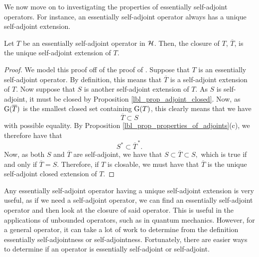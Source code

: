 We now move on to investigating the properties of essentially self-adjoint operators. For instance, an essentially self-adjoint operator always has a unique self-adjoint extension.


\begin{proposition}\label{lbl_prop_esa_has_closure_unique_sa_extension}
  Let $T$ be an essentially self-adjoint operator in $\mathcal{H}$. Then, the closure of $T$, $\overline{T}$, is the unique self-adjoint extension of $T$.
\end{proposition}
\begin{proof}
  We model this proof off of the proof of {\cite[Proposition 9.11]{Hall2013}}. Suppose that $T$ is an essentially self-adjoint operator. By definition, this means that $\overline{T}$ is a self-adjoint extension of $T$. Now suppose that $S$ is another self-adjoint extension of $T$. As $S$ is self-adjoint, it must be closed by Proposition \eqref{lbl_prop_adjoint_closed}. Now, as $\operatorname{G}(\overline{T})$ is the smallest closed set containing $\operatorname{G}(T)$, this clearly means that we have \[\overline{T} \subset S\] with possible equality. By Proposition \eqref{lbl_prop_properties_of_adjoints}(c), we therefore have that \[S^* \subset \overline{T}^{\,*}.\] Now, as both $S$ and $\overline{T}$ are self-adjoint, we have that $S \subset \overline{T} \subset S,$ which is true if and only if $\overline{T} = S$. Therefore, if $T$ is closable, we must have that $\overline{T}$ is the unique self-adjoint closed extension of $T$.
\end{proof}

Any essentially self-adjoint operator having a unique self-adjoint extension is very useful, as if we need a self-adjoint operator, we can find an essentially self-adjoint operator and then look at the closure of said operator. This is useful in the applications of unbounded operators, such as in quantum mechanics. However, for a general operator, it can take a lot of work to determine from the definition essentially self-adjointness or self-adjointness. Fortunately, there are easier ways to determine if an operator is essentially self-adjoint or self-adjoint.

